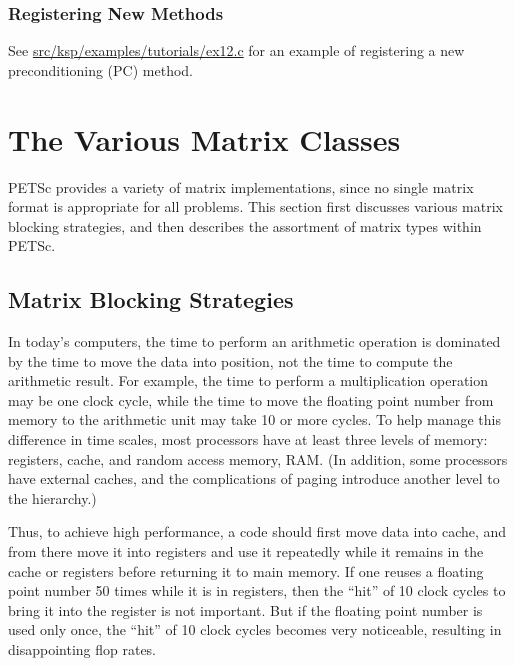 \documentclass[twoside,12pt]{../sty/report_petsc}
\newcommand{\sindex}[1]{\index{#1}}
\begin{document}
\subsection{Registering New Methods}
\label{sec:registeringnewmethods}

See \href{http://www.mcs.anl.gov/petsc/petsc-dev/src/ksp/ksp/examples/tutorials/ex12.c.html}{src/ksp/examples/tutorials/ex12.c} for an example of registering a new
preconditioning (PC) method.



\chapter{The Various Matrix Classes}
\label{sec:matclasses}

PETSc provides a variety of matrix implementations, since no single
matrix format is appropriate for all problems.  This section first
discusses various matrix blocking strategies, and then
describes the assortment of matrix types within PETSc.

\section{Matrix Blocking Strategies}
\sindex{matrix blocking}
\sindex{blocking}

In today's computers, the time to perform an arithmetic operation is
dominated by the time to move the data into position, not the time to
compute the arithmetic result.  For example, the time to perform a
multiplication operation may be one clock cycle, while the time to
move the floating point number from memory to the arithmetic unit may
take 10 or more cycles. To help manage this difference in time scales,
most processors have at least three levels of memory: registers,
cache, and random access memory, RAM. (In addition, some processors
have external caches, and the complications of paging introduce
another level to the hierarchy.)

Thus, to achieve high performance, a code should first move data into
cache, and from there move it into registers and use it repeatedly
while it remains in the cache or registers before returning it to main
memory. If one reuses a floating point number 50 times while it is in
registers, then the ``hit'' of 10 clock cycles to bring it into the
register is not important. But if the floating point number is used
only once, the ``hit'' of 10 clock cycles becomes very noticeable,
resulting in disappointing flop rates.
\end{document}
